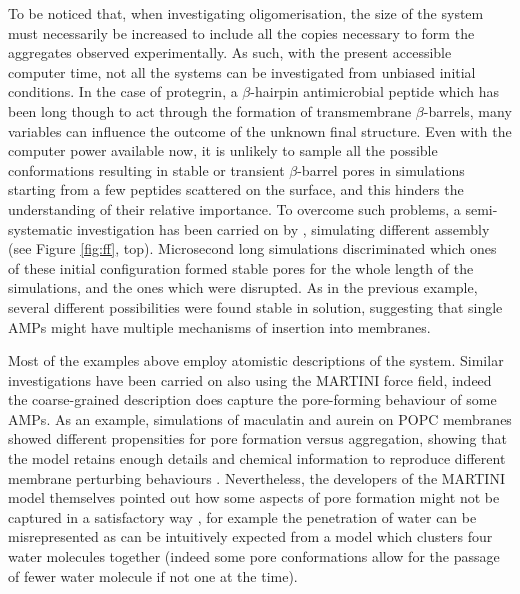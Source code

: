 To be noticed that, when investigating oligomerisation, the size of the system must necessarily be increased to include all the copies necessary to form the aggregates observed experimentally. As such, with the present accessible computer time, not all the systems can be investigated from unbiased initial conditions.
%
In the case of protegrin, a $\beta$-hairpin antimicrobial peptide which has been long though to act through the formation of transmembrane $\beta$-barrels, many variables can influence the outcome of the unknown final structure.
%
Even with the computer power available now, it is unlikely to sample all the possible conformations resulting in stable or transient $\beta$-barrel pores in simulations starting from a few peptides scattered on the surface, and this hinders the understanding of their relative importance.
%
To overcome such problems, a semi-systematic investigation has been carried on by \citet{Lipkin2017}, simulating different assembly (see Figure \ref{fig:ff}, top).
%
Microsecond long simulations discriminated which ones of these initial configuration formed stable pores for the whole length of the simulations, and the ones which were disrupted. As in the previous example, several different possibilities were found stable in solution, suggesting that single AMPs might have multiple mechanisms of insertion into membranes.

Most of the examples above employ atomistic descriptions of the system. Similar investigations have been carried on also using the MARTINI force field, indeed the coarse-grained description does capture the pore-forming behaviour of some AMPs.
%
As an example, simulations of maculatin and aurein on POPC membranes showed different propensities for pore formation versus aggregation, showing that the model retains enough details and chemical information to reproduce different membrane perturbing behaviours \citep{Balatti2017}.
%
Nevertheless, the developers of the MARTINI model themselves pointed out how some aspects of pore formation might not be captured in a satisfactory way \citep{Marrink2013}, for example the penetration of water can be misrepresented as can be intuitively expected from a model which clusters four water molecules together (indeed some pore conformations allow for the passage of fewer water molecule if not one at the time).

